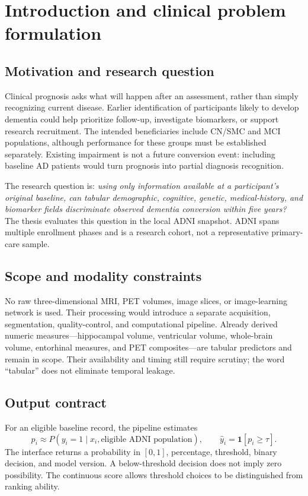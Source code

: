 \documentclass[11pt,a4paper]{article}
\begin{document}
\clearpage
\section{Introduction and clinical problem formulation}
\subsection{Motivation and research question}
Clinical prognosis asks what will happen after an assessment, rather than simply recognizing current disease. Earlier identification of participants likely to develop dementia could help prioritize follow-up, investigate biomarkers, or support research recruitment. The intended beneficiaries include CN/SMC and MCI populations, although performance for these groups must be established separately. Existing impairment is not a future conversion event: including baseline AD patients would turn prognosis into partial diagnosis recognition.

The research question is: \emph{using only information available at a participant's original baseline, can tabular demographic, cognitive, genetic, medical-history, and biomarker fields discriminate observed dementia conversion within five years?} The thesis evaluates this question in the local ADNI snapshot. ADNI spans multiple enrollment phases and is a research cohort, not a representative primary-care sample.
\subsection{Scope and modality constraints}
No raw three-dimensional MRI, PET volumes, image slices, or image-learning network is used. Their processing would introduce a separate acquisition, segmentation, quality-control, and computational pipeline. Already derived numeric measures---hippocampal volume, ventricular volume, whole-brain volume, entorhinal measures, and PET composites---are tabular predictors and remain in scope. Their availability and timing still require scrutiny; the word ``tabular'' does not eliminate temporal leakage.
\subsection{Output contract}
For an eligible baseline record, the pipeline estimates
\begin{equation}p_i\approx P(y_i=1\mid x_i,\text{eligible ADNI population}),\qquad
\widehat y_i=\mathbf{1}[p_i\geq\tau].\end{equation}
The interface returns a probability in $[0,1]$, percentage, threshold, binary decision, and model version. A below-threshold decision does not imply zero possibility. The continuous score allows threshold choices to be distinguished from ranking ability.
\end{document}
